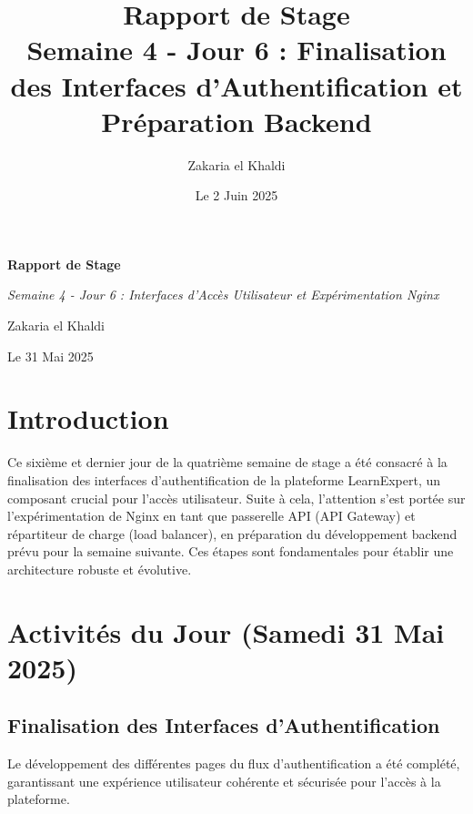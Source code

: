 \documentclass[12pt, a4paper]{article}
\title{\Huge\bfseries\color{primary} Rapport de Stage \\ 
      \Large Semaine 4 - Jour 6 : Finalisation des Interfaces d'Authentification et Préparation Backend} %
\author{\Large Zakaria el Khaldi}
\date{\large Le 2 Juin 2025} %
\begin{document}
\begin{titlepage}
  \centering
  {\Huge\bfseries\color{primary} Rapport de Stage \par}
  \vspace{1cm}
  {\Large\itshape Semaine 4 - Jour 6 : Interfaces d'Accès Utilisateur et Expérimentation Nginx\par} %
  \vspace{2cm}
  
  \vspace{2cm}
  {\Large Zakaria el Khaldi\par}
  \vfill
  {\large Le 31 Mai 2025\par} %
\end{titlepage}

\tableofcontents
\thispagestyle{empty}
\newpage

\section{Introduction}
\thispagestyle{fancy}
Ce sixième et dernier jour de la quatrième semaine de stage a été consacré à la finalisation des interfaces d'authentification de la plateforme LearnExpert, un composant crucial pour l'accès utilisateur. Suite à cela, l'attention s'est portée sur l'expérimentation de Nginx en tant que passerelle API (API Gateway) et répartiteur de charge (load balancer), en préparation du développement backend prévu pour la semaine suivante. Ces étapes sont fondamentales pour établir une architecture robuste et évolutive.

\section{Activités du Jour (Samedi 31 Mai 2025)} %

\subsection{Finalisation des Interfaces d'Authentification}
Le développement des différentes pages du flux d'authentification a été complété, garantissant une expérience utilisateur cohérente et sécurisée pour l'accès à la plateforme.
\end{document}
